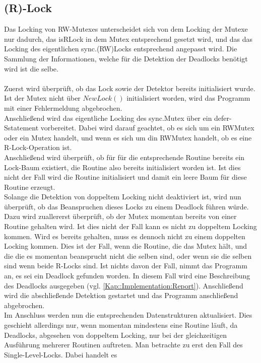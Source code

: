 \subsection{(R)-Lock}
Das Locking von RW-Mutexes unterscheidet sich von dem Locking der Mutexe nur
dadurch, das isRLock in dem Mutex entsprechend gesetzt wird, und das das 
Locking des eigentlichen sync.(RW)Locks entsprechend angepasst wird. Die 
Sammlung der Informationen, welche für die Detektion der Deadlocks benötigt
wird ist die selbe.\\\\
Zuerst wird überprüft, ob das Lock sowie der Detektor bereits initialisiert 
wurde. Ist der Mutex nicht über $NewLock()$ initialisiert worden, wird das 
Programm mit einer Fehlermeldung abgebrochen. \\
Anschließend wird das eigentliche Locking des sync.Mutex über ein defer-Sstatement
vorbereitet. Dabei wird darauf geachtet, ob es sich um ein RWMutex
oder ein Mutex handelt, und wenn es sich um din RWMutex handelt, ob es eine 
R-Lock-Operation ist.\\
Anschließend wird überprüft, ob für für die entsprechende Routine bereits ein 
Lock-Baum existiert, die Routine also bereits initialisiert worden ist. 
Ist dies nicht der Fall wird die Routine initialisiert und damit ein leere Baum 
für diese Routine erzeugt.\\
Solange die Detektion von doppeltem Locking nicht deaktiviert ist, wird nun
überprüft, ob das Beanspruchen dieses Locks zu einem Deadlock führen würde.
Dazu wird zuallererst überprüft, ob der Mutex momentan bereits von einer 
Routine gehalten wird. Ist dies nicht der Fall kann es nicht zu doppeltem Locking 
kommen. Wird es bereits gehalten, muss es dennoch nicht zu einem doppelten 
Locking kommen. Dies ist der Fall, wenn die Routine, die das Mutex hält, und 
die die es momentan beansprucht nicht die selben sind, oder wenn sie die selben 
sind wenn beide R-Locks sind. Ist nichts davon der Fall, nimmt das Programm an, 
es sei ein Deadlock gefunden worden. In diesem Fall wird eine Beschreibung des 
Deadlocks ausgegeben (vgl. \ref{Kap::Implementation:Report}). Anschließend wird 
die abschließende Detektion gestartet und das Programm anschließend abgebrochen.\\
Im Anschluss werden nun die entsprechenden Datenstrukturen aktualisiert. Dies geschieht 
allerdings nur, wenn momentan mindestens eine Routine läuft, da Deadlocks, abgesehen
von doppeltem Locking, nur bei der gleichzeitigen Ausführung mehrerer Routinen 
auftreten. Man betrachte zu erst den Fall des Single-Level-Locks. Dabei handelt es 
